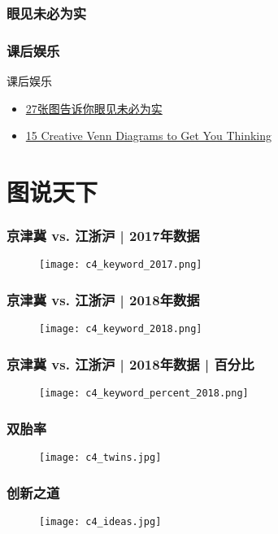 \begin{frame}
  \frametitle{眼见未必为实}
  \begin{figure}
    \centering
    \quad
  \end{figure}
\end{frame}

\begin{frame}
  \frametitle{课后娱乐}
  \begin{block}{课后娱乐}
    \begin{itemize}
      \item \href{http://www.guancha.cn/Celebrity/2014_11_04_282826.shtml}{27张图告诉你眼见未必为实}
      \item \href{http://creately.com/blog/diagrams/creative-venn-diagrams/}{15 Creative Venn Diagrams to Get You Thinking}
    \end{itemize}
  \end{block}
\end{frame}

\section{图说天下}
\begin{frame}
  \frametitle{京津冀 vs. 江浙沪 | 2017年数据}
  \begin{figure}
    \centering
    \texttt{[image: c4\_keyword\_2017.png]}
  \end{figure}
\end{frame}

\begin{frame}
  \frametitle{京津冀 vs. 江浙沪 | 2018年数据}
  \begin{figure}
    \centering
    \texttt{[image: c4\_keyword\_2018.png]}
  \end{figure}
\end{frame}

\begin{frame}
  \frametitle{京津冀 vs. 江浙沪 | 2018年数据 | 百分比}
  \begin{figure}
    \centering
    \texttt{[image: c4\_keyword\_percent\_2018.png]}
  \end{figure}
\end{frame}

\begin{frame}
  \frametitle{双胎率}
  \begin{figure}
    \centering
    \texttt{[image: c4\_twins.jpg]}
  \end{figure}
\end{frame}

\begin{frame}
  \frametitle{创新之道}
  \begin{figure}
    \centering
    \texttt{[image: c4\_ideas.jpg]}
  \end{figure}
\end{frame}




